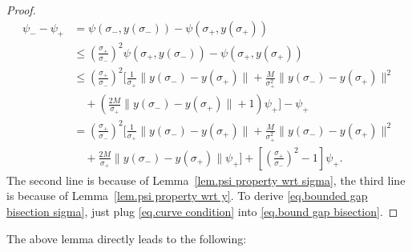 \documentclass{mcom-l}
\numberwithin{equation}{section}
\begin{document}
\begin{proof}
    \begin{equation*}
        \begin{aligned}
            \psi_- -\psi_+
             & = \psi(\sigma_-,y(\sigma_-))-\psi(\sigma_+,y(\sigma_+))                                               \\
             & \leq \left(\frac{\sigma_+}{\sigma_-}\right)^2 \psi(\sigma_+,y(\sigma_-)) - \psi(\sigma_+,y(\sigma_+)) \\
             & \leq \left(\frac{\sigma_+}{\sigma_-}\right)^2 \Bigg[
                \frac{1}{\sigma_+}\|y(\sigma_-)-y(\sigma_+)\|
            + \frac{M}{\sigma_+^2} \|y(\sigma_-)-y(\sigma_+)\|^2                                                     \\
             & \quad + \left( \frac{2M}{\sigma_+} \|y(\sigma_-)-y(\sigma_+)\| + 1 \right)\psi_+
            \Bigg] - \psi_+                                                                                          \\
             & = \left(\frac{\sigma_+}{\sigma_-} \right)^2 \Bigg[
                \frac{1}{\sigma_+} \|y(\sigma_-)-y(\sigma_+)\|
            + \frac{M}{\sigma_+^2} \|y(\sigma_-)-y(\sigma_+)\|^2                                                     \\
             & \quad + \frac{2M}{\sigma_+} \|y(\sigma_-)-y(\sigma_+)\|\psi_+
                \Bigg] + \left[ \left(\frac{\sigma_+}{\sigma_-} \right)^2 - 1 \right] \psi_+.
        \end{aligned}
    \end{equation*}
    The second line is because of Lemma~\ref{lem.psi property wrt sigma}, the third line is because of Lemma~\ref{lem.psi property wrt y}. To derive \eqref{eq.bounded gap bisection sigma}, just plug \eqref{eq.curve condition} into \eqref{eq.bound gap bisection}.
\end{proof}
The above lemma directly leads to the following:
\end{document}
